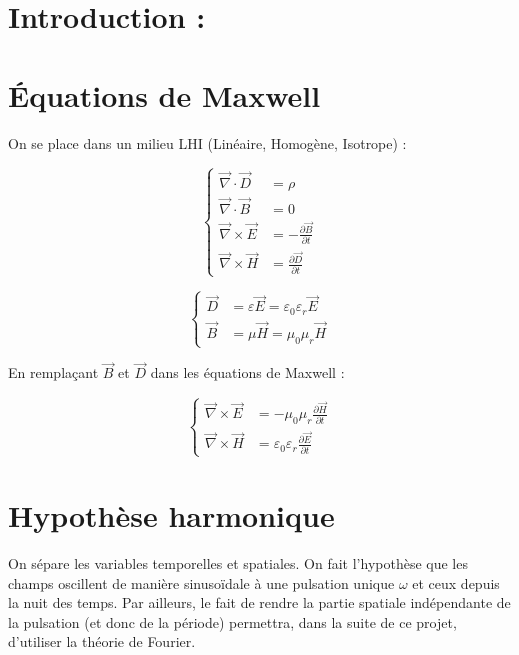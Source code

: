 \documentclass{article}
\begin{document}
\section*{Introduction :}
\bigskip

\section*{Équations de Maxwell}

On se place dans un milieu LHI (Linéaire, Homogène, Isotrope) :

\[
\left\{
\begin{aligned}
\vec{\nabla} \cdot \vec{D} &= \rho \\
\vec{\nabla} \cdot \vec{B} &= 0 \\
\vec{\nabla} \times \vec{E} &= -\frac{\partial \vec{B}}{\partial t} \\
\vec{\nabla} \times \vec{H} &= \frac{\partial \vec{D}}{\partial t}
\end{aligned}
\right.
\]


\[
\left\{
\begin{aligned}
\vec{D} &= \varepsilon \vec{E} = \varepsilon_0 \varepsilon_r \vec{E} \\
\vec{B} &= \mu \vec{H} = \mu_0 \mu_r \vec{H}
\end{aligned}
\right.
\]

En remplaçant \(\vec{B}\) et \(\vec{D}\) dans les équations de Maxwell :

\[
\left\{
\begin{aligned}
\vec{\nabla} \times \vec{E} &= - \mu_0 \mu_r \frac{\partial \vec{H}}{\partial t} \\
\vec{\nabla} \times \vec{H} &= \varepsilon_0 \varepsilon_r \frac{\partial \vec{E}}{\partial t}
\end{aligned}
\right.
\]

\section*{Hypothèse harmonique}

On sépare les variables temporelles et spatiales. On fait l’hypothèse que les champs oscillent de manière sinusoïdale à une pulsation unique \(\omega\) et ceux depuis la nuit des temps. Par ailleurs, le fait de rendre la partie spatiale indépendante de la pulsation (et donc de la période) permettra, dans la suite de ce projet, d'utiliser la théorie de Fourier.
\end{document}
